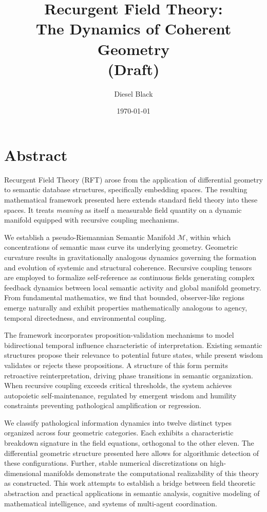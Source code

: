 \documentclass[11pt, a4paper]{report}
\title{Recurgent Field Theory: \\ The Dynamics of Coherent Geometry \\ \vspace{1em} \small{(Draft)}}
\author{Diesel Black}
\date{\today}
\begin{document}

\maketitle

\section*{Abstract}

Recurgent Field Theory (RFT) arose from the application of differential geometry to semantic database structures, specifically embedding spaces. The resulting mathematical framework presented here extends standard field theory into these spaces. It treats \textit{meaning} as itself a measurable field quantity on a dynamic manifold equipped with recursive coupling mechanisms.

\vspace{1em}

We establish a pseudo-Riemannian Semantic Manifold \(\mathcal{M}\), within which concentrations of semantic mass curve its underlying geometry. Geometric curvature results in gravitationally analogous dynamics governing the formation and evolution of systemic and structural coherence. Recursive coupling tensors are employed to formalize self-reference as continuous fields generating complex feedback dynamics between local semantic activity and global manifold geometry. From fundamental mathematics, we find that bounded, observer-like regions emerge naturally and exhibit properties mathematically analogous to agency, temporal directedness, and environmental coupling.

\vspace{1em}

The framework incorporates proposition-validation mechanisms to model bidirectional temporal influence characteristic of interpretation. Existing semantic structures propose their relevance to potential future states, while present wisdom validates or rejects these propositions. A structure of this form permits retroactive reinterpretation, driving phase transitions in semantic organization. When recursive coupling exceeds critical thresholds, the system achieves autopoietic self-maintenance, regulated by emergent wisdom and humility constraints preventing pathological amplification or regression.

\vspace{1em}

We classify pathological information dynamics into twelve distinct types organized across four geometric categories. Each exhibits a characteristic breakdown signature in the field equations, orthogonal to the other eleven. The differential geometric structure presented here allows for algorithmic detection of these configurations. Further, stable numerical discretizations on high-dimensional manifolds demonstrate the computational realizability of this theory as constructed. This work attempts to establish a bridge between field theoretic abstraction and practical applications in semantic analysis, cognitive modeling of mathematical intelligence, and systems of multi-agent coordination.
\end{document}
